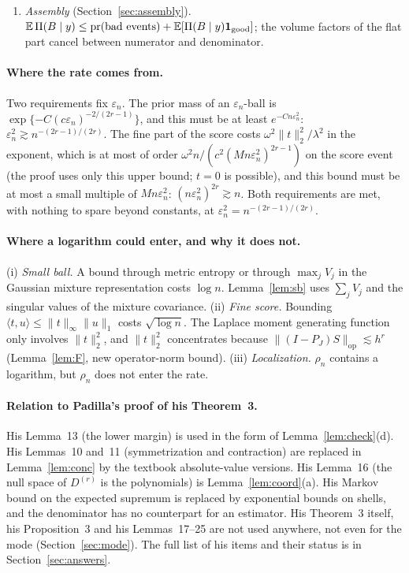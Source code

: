 \documentclass[11pt]{article}
\theoremstyle{definition}
\theoremstyle{remark}
\newcommand{\E}{\mathbb{E}}
\newcommand{\pr}{\mathrm{pr}}
\newcommand{\Dr}{D^{(r)}}
\newcommand{\om}{\omega}
\newcommand{\en}{\varepsilon_n}
\newcommand{\ind}{\mathbf 1}
\newcommand{\op}{\mathrm{op}}
\begin{document}
\begin{enumerate}[itemsep=3pt,topsep=3pt,label=\textbf{Step \arabic*.},leftmargin=*]
\item \emph{Assembly} (Section~\ref{sec:assembly}). $\E\,\Pi(B\mid y)\le\pr(\text{bad events})+\E[\Pi(B\mid y)\ind_{\rm good}]$; the volume factors of the flat part cancel between numerator and denominator.
\end{enumerate}

\paragraph{Where the rate comes from.} Two requirements fix $\en$. The prior mass of an $\en$-ball is $\exp\{-C(c\en)^{-2/(2r-1)}\}$, and this must be at least $e^{-Cn\en^2}$: $\en^2\gtrsim n^{-(2r-1)/(2r)}$. The fine part of the score costs $\om^2\|t\|_2^2/\lambda^2$ in the exponent, which is at most of order $\om^2n/(c^2(Mn\en^2)^{2r-1})$ on the score event (the proof uses only this upper bound; $t=0$ is possible), and this bound must be at most a small multiple of $Mn\en^2$: $(n\en^2)^{2r}\gtrsim n$. Both requirements are met, with nothing to spare beyond constants, at $\en^2=n^{-(2r-1)/(2r)}$.

\paragraph{Where a logarithm could enter, and why it does not.}
(i) \emph{Small ball.} A bound through metric entropy or through $\max_jV_j$ in the Gaussian mixture representation costs $\log n$. Lemma~\ref{lem:sb} uses $\sum_jV_j$ and the singular values of the mixture covariance.
(ii) \emph{Fine score.} Bounding $\langle t,u\rangle\le\|t\|_\infty\|u\|_1$ costs $\sqrt{\log n}$. The Laplace moment generating function only involves $\|t\|_2^2$, and $\|t\|_2^2$ concentrates because $\|(I-P_J)S\|_{\op}\lesssim h^{r}$ (Lemma~\ref{lem:F}, new operator-norm bound).
(iii) \emph{Localization.} $\rho_n$ contains a logarithm, but $\rho_n$ does not enter the rate.

\paragraph{Relation to Padilla's proof of his Theorem~3.} His Lemma~13 (the lower margin) is used in the form of Lemma~\ref{lem:check}(d). His Lemmas~10 and~11 (symmetrization and contraction) are replaced in Lemma~\ref{lem:conc} by the textbook absolute-value versions. His Lemma~16 (the null space of $\Dr$ is the polynomials) is Lemma~\ref{lem:coord}(a). His Markov bound on the expected supremum is replaced by exponential bounds on shells, and the denominator has no counterpart for an estimator. His Theorem~3 itself, his Proposition~3 and his Lemmas~17--25 are not used anywhere, not even for the mode (Section~\ref{sec:mode}). The full list of his items and their status is in Section~\ref{sec:answers}.
\end{document}

